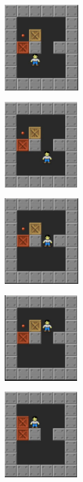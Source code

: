 \documentclass[10pt, final]{article}
\begin{document}
						\begin{figure}[h!]
			{
				\begin{subfigure}[h!]{1.3in}
					\includegraphics[height=1.5in]{s1.png}
				\end{subfigure}
				\begin{subfigure}[h!]{1.3in}
					\includegraphics[height=1.5in]{s2.png}
				\end{subfigure}
				\begin{subfigure}[h!]{1.3in}
					\includegraphics[height=1.5in]{s3.png}
				\end{subfigure}
				\begin{subfigure}[h!]{1.3in}
					\includegraphics[height=1.5in]{s4.png}
				\end{subfigure}
				\begin{subfigure}[h!]{1.3in}
					\includegraphics[height=1.5in]{s5.png}
			\end{subfigure}}
			\label{fig:chain}
		\end{figure}
	
\end{document}
